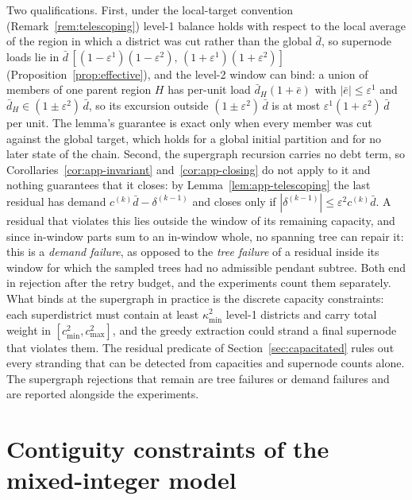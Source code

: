\documentclass[preprint,12pt,authoryear]{elsarticle}
\theoremstyle{definition}
\begin{document}
Two qualifications. First, under the local-target convention (Remark~\ref{rem:telescoping}) level-1 balance holds with respect to the local average of the region in which a district was cut rather than the global $\bar{d}$, so supernode loads lie in $\bar{d}\,[(1-\varepsilon^{1})(1-\varepsilon^{2}),\,(1+\varepsilon^{1})(1+\varepsilon^{2})]$ (Proposition~\ref{prop:effective}), and the level-2 window can bind: a union of members of one parent region $H$ has per-unit load $\bar d_H(1+\bar e)$ with $|\bar e| \le \varepsilon^1$ and $\bar d_H \in (1\pm\varepsilon^2)\,\bar d$, so its excursion outside $(1\pm\varepsilon^2)\,\bar d$ is at most $\varepsilon^1(1+\varepsilon^2)\,\bar d$ per unit. The lemma's guarantee is exact only when every member was cut against the global target, which holds for a global initial partition and for no later state of the chain. Second, the supergraph recursion carries no debt term, so Corollaries~\ref{cor:app-invariant} and~\ref{cor:app-closing} do not apply to it and nothing guarantees that it closes: by Lemma~\ref{lem:app-telescoping} the last residual has demand $c^{(k)}\bar d - \delta^{(k-1)}$ and closes only if $|\delta^{(k-1)}| \le \varepsilon^2 c^{(k)} \bar d$. A residual that violates this lies outside the window of its remaining capacity, and since in-window parts sum to an in-window whole, no spanning tree can repair it: this is a \emph{demand failure}, as opposed to the \emph{tree failure} of a residual inside its window for which the sampled trees had no admissible pendant subtree. Both end in rejection after the retry budget, and the experiments count them separately. What binds at the supergraph in practice is the discrete capacity constraints: each superdistrict must contain at least $\kappa^{2}_{\min}$ level-1 districts and carry total weight in $[c^{2}_{\min}, c^{2}_{\max}]$, and the greedy extraction could strand a final supernode that violates them. The residual predicate of Section~\ref{sec:capacitated} rules out every stranding that can be detected from capacities and supernode counts alone. The supergraph rejections that remain are tree failures or demand failures and are reported alongside the experiments.

\section{Contiguity constraints of the mixed-integer model}
\label{app:shir}
\end{document}
